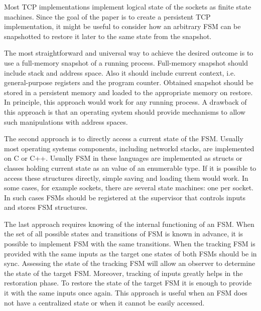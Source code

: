 Most TCP implementations implement logical state of the sockets as finite state
machines. Since the goal of the paper is to create a persistent TCP
implementation, it might be useful to consider how an arbitrary FSM can be
snapshotted to restore it later to the same state from the snapshot. 

The most straightforward and universal way to achieve the desired outcome is to
use a full-memory snapshot of a running process. Full-memory snapshot should
include stack and address space. Also it should include current context, i.e.
general-purpose registers and the program counter. Obtained snapshot should be
stored in a persistent memory and loaded to the appropriate memory on restore.
In principle, this approach would work for any running process. A drawback of
this approach is that an operating system should provide mechanisms to allow
such manipulations with address spaces.

The second approach is to directly access a current state of the FSM. Usually
most operating systems components, including networkd stacks, are implemented
on C or C++. Usually FSM in these languages are implemented as structs or
classes holding current state as an value of an enumerable type. If it is
possible to access these structures directly, simple saving and loading them
would work. In some cases, for example sockets, there are several state
machines: one per socket. In such cases FSMs should be registered at the
supervisor that controls inputs and stores FSM structures.

The last approach requires knowing of the internal functioning of an FSM. When
the set of all possible states and transitions of FSM is known in advance, it
is possible to implement FSM with the same transitions. When the tracking FSM
is provided with the same inputs as the target one states of both FSMs should
be in sync. Assessing the state of the tracking FSM will allow an observer to
determine the state of the target FSM.  Moreover, tracking of inputs greatly
helps in the restoration phase. To restore the state of the target FSM it is
enough to provide it with the same inputs once again. This approach is useful
when an FSM does not have a centralized state or when it cannot be easily
accessed.

